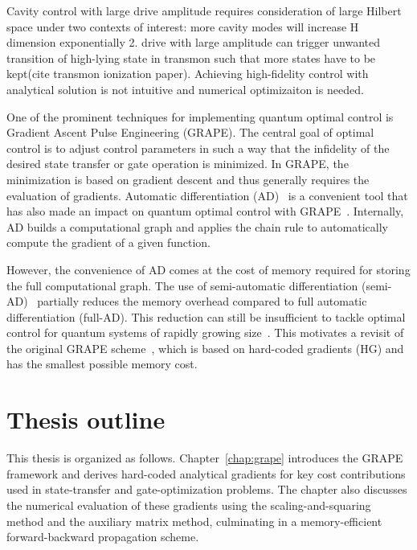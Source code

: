 Cavity control with large drive amplitude requires consideration of large Hilbert space under two contexts of interest: more cavity modes will increase H dimension exponentially 2. drive with large amplitude can trigger unwanted transition of high-lying state in transmon such that more states have to be kept(cite transmon ionization paper). Achieving high-fidelity control with analytical solution is not intuitive and numerical optimizaiton is needed.

One of the prominent techniques for implementing quantum optimal control is Gradient Ascent Pulse Engineering (GRAPE).%
The central goal of optimal control is to adjust control parameters in such a way that the infidelity of the desired state transfer or gate operation is minimized. In GRAPE, the minimization is based on gradient descent and thus generally requires the evaluation of gradients. Automatic differentiation (AD)~\cite{baydin2018automatic} is a convenient tool that has also made an impact on quantum optimal control with GRAPE~\cite{pacleung2017speedup,pacqoc,abdelhafez2019gradient,grapead}. Internally, AD builds a computational graph and applies the chain rule to automatically compute the gradient of a given function.

However, the convenience of AD comes at the cost of memory required for storing the full computational graph. The use of semi-automatic differentiation (semi-AD)~\cite{semiadgoerz2022quantum} partially reduces the memory overhead compared to full automatic differentiation (full-AD). This reduction can still be insufficient to tackle optimal control for quantum systems of rapidly growing size~\cite{arute2019quantum,gong2021quantum}. This motivates a revisit of the original GRAPE scheme~\cite{nmrkhaneja2005optimal}, which is based on hard-coded gradients (HG) and has the smallest possible memory cost. 


\section{Thesis outline}

This thesis is organized as follows.
Chapter~\ref{chap:grape} introduces the GRAPE framework and derives hard-coded analytical gradients for key cost contributions used in state-transfer and gate-optimization problems. The chapter also discusses the numerical evaluation of these gradients using the scaling-and-squaring method and the auxiliary matrix method, culminating in a memory-efficient forward-backward propagation scheme.

